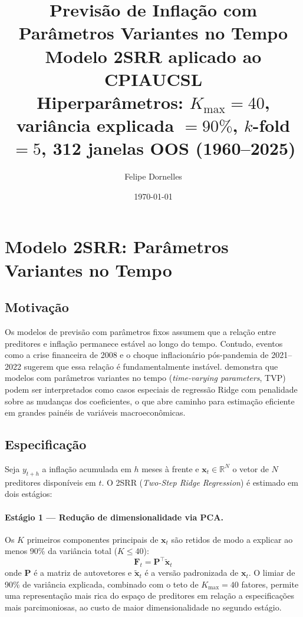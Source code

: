\documentclass[12pt, a4paper]{article}
\begin{document}
\title{\textbf{Previsão de Inflação com Parâmetros Variantes no Tempo}\\
       \large Modelo 2SRR aplicado ao CPIAUCSL\\[0.4em]
       \normalsize Hiperparâmetros: $K_{\max}=40$,
       variância explicada $= 90\%$, $k$-fold $= 5$,
       312 janelas OOS (1960--2025)}
\author{Felipe Dornelles}
\date{\today}
\maketitle
\newpage
\tableofcontents
\newpage

\section{Modelo 2SRR: Parâmetros Variantes no Tempo}
\label{sec:modelo}

\subsection{Motivação}

Os modelos de previsão com parâmetros fixos assumem que a relação
entre preditores e inflação permanece estável ao longo do tempo.
Contudo, eventos como a crise financeira de 2008 e o choque
inflacionário pós-pandemia de 2021--2022 sugerem que essa relação
é fundamentalmente instável. \citet{Coulombe2025} demonstra que
modelos com parâmetros variantes no tempo
(\textit{time-varying parameters}, TVP) podem ser interpretados
como casos especiais de regressão Ridge com penalidade sobre as
mudanças dos coeficientes, o que abre caminho para estimação
eficiente em grandes painéis de variáveis macroeconômicas.

\subsection{Especificação}

Seja $y_{t+h}$ a inflação acumulada em $h$ meses à frente e
$\mathbf{x}_t \in \mathbb{R}^N$ o vetor de $N$ preditores
disponíveis em $t$. O 2SRR (\textit{Two-Step Ridge Regression})
é estimado em dois estágios:

\paragraph{Estágio 1 — Redução de dimensionalidade via PCA.}
Os $K$ primeiros componentes principais de $\mathbf{x}_t$ são
retidos de modo a explicar ao menos 90\% da variância total
($K \leq 40$):
\[
  \mathbf{F}_t = \mathbf{P}^\top \tilde{\mathbf{x}}_t
\]
onde $\mathbf{P}$ é a matriz de autovetores e
$\tilde{\mathbf{x}}_t$ é a versão padronizada de $\mathbf{x}_t$.
O limiar de 90\% de variância explicada, combinado com o teto
de $K_{\max} = 40$ fatores, permite uma representação mais rica
do espaço de preditores em relação a especificações mais
parcimoniosas, ao custo de maior dimensionalidade no segundo
estágio.
\end{document}
